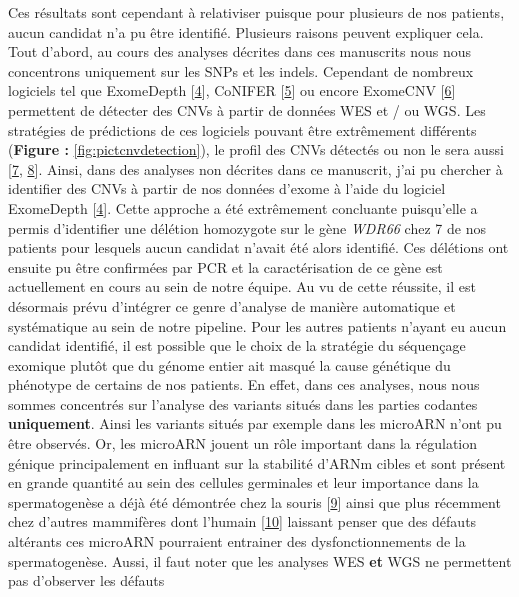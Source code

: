 \documentclass[12pt,twoside]{ugathesis}
\begin{document}
Ces résultats sont cependant à relativiser puisque pour plusieurs de nos
patients, aucun candidat n'a pu être identifié. Plusieurs raisons
peuvent expliquer cela. Tout d'abord, au cours des analyses décrites
dans ces manuscrits nous nous concentrons uniquement sur les SNPs et les
indels. Cependant de nombreux logiciels tel que ExomeDepth
{[}\protect\hyperlink{ref-Plagnol2012}{4}{]}, CoNIFER
{[}\protect\hyperlink{ref-Krumm2012}{5}{]} ou encore ExomeCNV
{[}\protect\hyperlink{ref-Sathirapongsasuti2011}{6}{]} permettent de
détecter des CNVs à partir de données WES et / ou WGS. Les stratégies de
prédictions de ces logiciels pouvant être extrêmement différents
(\textbf{Figure : }\ref{fig:pictcnvdetection}), le profil des CNVs
détectés ou non le sera aussi {[}\protect\hyperlink{ref-Zhao2013}{7},
\protect\hyperlink{ref-Guo2013}{8}{]}. Ainsi, dans des analyses non
décrites dans ce manuscrit, j'ai pu chercher à identifier des CNVs à
partir de nos données d'exome à l'aide du logiciel ExomeDepth
{[}\protect\hyperlink{ref-Plagnol2012}{4}{]}. Cette approche a été
extrêmement concluante puisqu'elle a permis d'identifier une délétion
homozygote sur le gène \emph{WDR66} chez 7 de nos patients pour lesquels
aucun candidat n'avait été alors identifié. Ces délétions ont ensuite pu
être confirmées par PCR et la caractérisation de ce gène est
actuellement en cours au sein de notre équipe. Au vu de cette réussite,
il est désormais prévu d'intégrer ce genre d'analyse de manière
automatique et systématique au sein de notre pipeline. Pour les autres
patients n'ayant eu aucun candidat identifié, il est possible que le
choix de la stratégie du séquençage exomique plutôt que du génome entier
ait masqué la cause génétique du phénotype de certains de nos patients.
En effet, dans ces analyses, nous nous sommes concentrés sur l'analyse
des variants situés dans les parties codantes \textbf{uniquement}. Ainsi
les variants situés par exemple dans les microARN n'ont pu être
observés. Or, les microARN jouent un rôle important dans la régulation
génique principalement en influant sur la stabilité d'ARNm cibles et
sont présent en grande quantité au sein des cellules germinales et leur
importance dans la spermatogenèse a déjà été démontrée chez la souris
{[}\protect\hyperlink{ref-Comazzetto2014}{9}{]} ainsi que plus récemment
chez d'autres mammifères dont l'humain
{[}\protect\hyperlink{ref-Chen2017}{10}{]} laissant penser que des
défauts altérants ces microARN pourraient entrainer des
dysfonctionnements de la spermatogenèse. Aussi, il faut noter que les
analyses WES \textbf{et} WGS ne permettent pas d'observer les défauts
\end{document}

